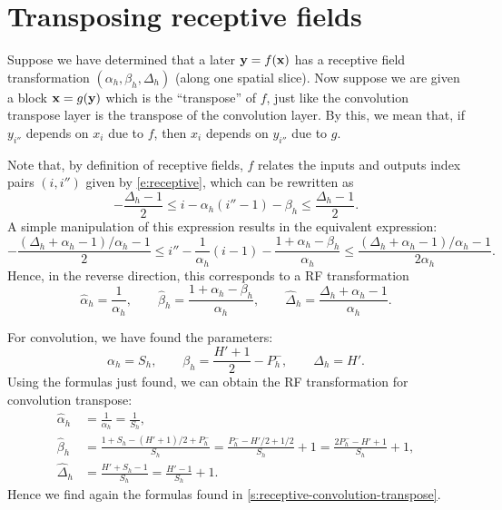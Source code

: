 \section{Transposing receptive fields}\label{s:receptive-transposing}

Suppose we have determined that a later $\mathbf{y} = f(\mathbf{x})$ has a receptive field transformation $(\alpha_h,\beta_h,\Delta_h)$ (along one spatial slice). Now suppose we are given a block $\mathbf{x} = g(\mathbf{y})$ which is the ``transpose'' of $f$, just like the convolution transpose layer is the transpose of the convolution layer. By this, we mean that, if $y_{i''}$ depends on $x_{i}$ due to $f$, then $x_{i}$ depends on $y_{i''}$ due to $g$.

Note that, by definition of receptive fields, $f$ relates the  inputs and outputs index pairs $(i,i'')$ given by \autoref{e:receptive}, which can be rewritten as
\[
- \frac{\Delta_h-1}{2} \leq  i - \alpha_h (i'' -1) - \beta_h \leq\frac{\Delta_h-1}{2}.
\]
A simple manipulation of this expression results in the equivalent expression:
\[
- \frac{(\Delta_h + \alpha_h - 1)/\alpha_h-1}{2} \leq  i'' - \frac{1}{\alpha_h} (i - 1) - \frac{1 + \alpha_h - \beta_h }{\alpha_h} \leq\frac{(\Delta_h + \alpha_h - 1)/\alpha_h-1}{2\alpha_h}.
\]
Hence, in the reverse direction, this corresponds to a RF transformation
\[
\hat \alpha_h = \frac{1}{\alpha_h},
\qquad
\hat \beta_h = \frac{1 + \alpha_h - \beta_h}{\alpha_h},
\qquad
\hat \Delta_h = \frac{\Delta_h + \alpha_h -1}{\alpha_h}.
\]

\begin{example}
For convolution, we have found the parameters:
\[
\alpha_h = S_h,
\qquad
\beta_h = \frac{H'+1}{2} - P_h^-,
\qquad
\Delta_h = H'.
\]
Using the formulas just found, we can obtain the RF transformation for convolution transpose:
\begin{align*}
\hat \alpha_h &= \frac{1}{\alpha_h} = \frac{1}{S_h},
\\
\hat \beta_h &= \frac{1 + S_h - (H'+1)/2 + P_h^-}{S_h}
= \frac{P_h^- -H'/2 +1/2}{S_h} + 1
= \frac{2P_h^- -H' + 1}{S_h} + 1,
\\
\hat \Delta_h &= \frac{H' + S_h - 1}{S_h} = \frac{H' -1}{S_h} + 1.
\end{align*}
Hence we find again the formulas found in \autoref{s:receptive-convolution-transpose}.
\end{example}


